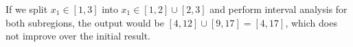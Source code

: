 If we split $x_1 \in [1,3]$ into $x_1\in [1,2] \cup [2,3]$ and
perform interval analysis for both subregions, the output would be
$[4,12]\cup[9,17] = [4,17]$, which does not improve over the initial
result.
%

